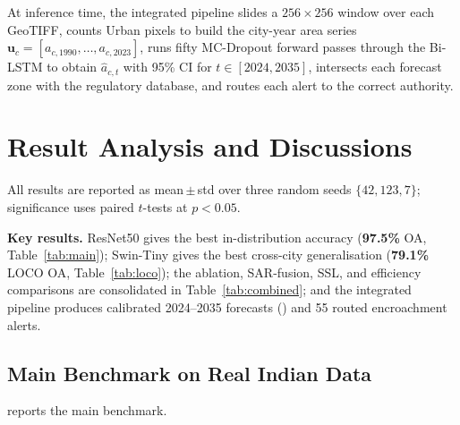 \documentclass[conference]{IEEEtran}
\begin{document}
At inference time, the integrated pipeline slides a $256{\times}256$ window over each GeoTIFF, counts Urban pixels to build the city-year area series $\mathbf{u}_c = [a_{c,1990}, \ldots, a_{c,2023}]$, runs fifty MC-Dropout forward passes through the Bi-LSTM to obtain $\hat{a}_{c,t}$ with 95\% CI for $t \in [2024, 2035]$, intersects each forecast zone with the regulatory database, and routes each alert to the correct authority.

\section{Result Analysis and Discussions}

All results are reported as mean\,$\pm$\,std over three random seeds $\{42, 123, 7\}$; significance uses paired $t$-tests at $p < 0.05$.

\noindent\textbf{Key results.} ResNet50 gives the best in-distribution accuracy (\textbf{97.5\%} OA, Table~\ref{tab:main}); Swin-Tiny gives the best cross-city generalisation (\textbf{79.1\%} LOCO OA, Table~\ref{tab:loco}); the ablation, SAR-fusion, SSL, and efficiency comparisons are consolidated in Table~\ref{tab:combined}; and the integrated pipeline produces calibrated 2024--2035 forecasts () and 55 routed encroachment alerts.

\subsection{Main Benchmark on Real Indian Data}

 reports the main benchmark.
\end{document}
